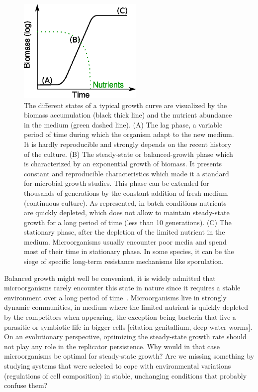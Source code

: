 \begin{figure}[!h]
\centering
\includegraphics[height=5cm]{./Fig/Chapter1/growth_curve.eps}
\caption{The different states of a typical growth curve are visualized by the biomass accumulation (black thick line) and the nutrient abundance in the medium (green dashed line).
(A) The lag phase, a variable period of time during which the organism adapt to the new medium.
It is hardly reproducible and strongly depends on the recent history of the culture.
(B) The steady-state or balanced-growth phase which is characterized by an exponential growth of biomass.
It presents constant and reproducible characteristics which made it a standard for microbial growth studies.
This phase can be extended for thousands of generations by the constant addition of fresh medium (continuous culture).
As represented, in batch conditions nutrients are quickly depleted, which does not allow to maintain steady-state growth for a long period of time (less than 10 generations).
(C) The stationary phase, after the depletion of the limited nutrient in the medium.
Microorganisms usually encounter poor media and spend most of their time in stationary phase.
In some species, it can be the siege of specific long-term resistance mechanisms like sporulation.
}
\label{fig:growth_curve}
\end{figure}

Balanced growth might well be convenient, it is widely admitted that microorganisms rarely encounter this state in nature since it requires a stable environment over a long period of time~\cite{schaechter_microbe_2006}.
Microorganisms live in strongly dynamic communities, in medium where the limited nutrient is quickly depleted by the competitors when appearing, the exception being bacteria that live a parasitic or symbiotic life in bigger cells [citation genitallium, deep water worms].
On an evolutionary perspective, optimizing the steady-state growth rate should not play any role in the replicator persistence.
Why would in that case microorganisms be optimal for steady-state growth?
Are we missing something by studying systems that were selected to cope with environmental variations (regulations of cell composition) in stable, unchanging conditions that probably confuse them?

